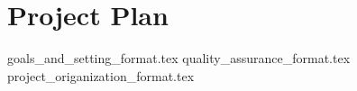 \documentclass{article}
\begin{document}

\section*{Project Plan}
{goals_and_setting_format.tex}
{quality_assurance_format.tex}
{project_origanization_format.tex}



\end{document}
